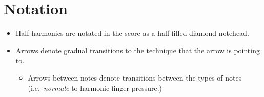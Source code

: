 \section*{Notation}
\begin{itemize}

    \item Half-harmonics are notated in the score as a half-filled diamond notehead.
    \item Arrows denote gradual transitions to the technique that the arrow is pointing to.\begin{itemize}
        \item Arrows between notes denote transitions between the types of notes (i.e.\ \emph{normale} to harmonic finger pressure.)
      \end{itemize}
\end{itemize}

\newpage\label{app:violinPiece Score}
